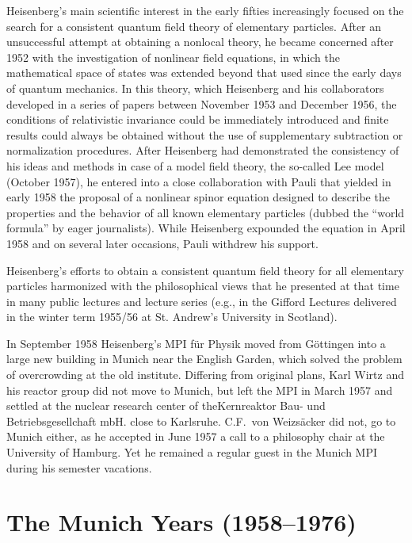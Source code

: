 \documentclass{article}
\begin{document}
Heisenberg's main scientific interest in the early fifties increasingly focused on the search for a consistent quantum field theory of elementary particles. After an unsuccessful attempt at obtaining a nonlocal theory, he became concerned after 1952 with the investigation of nonlinear field equations, in which the mathematical space of states was extended beyond that used since the early days of quantum mechanics. In this theory, which Heisenberg and his collaborators developed in a series of papers between November 1953 and December 1956, the conditions of relativistic invariance could be immediately introduced and finite results could always be obtained without the use of supplementary subtraction or normalization procedures. After Heisenberg had demonstrated the consistency of his ideas and methods in case of a model field theory, the so-called Lee model (October 1957), he entered into a close collaboration with Pauli that yielded in early 1958 the proposal of a nonlinear spinor equation designed to describe the properties and the behavior of all known elementary particles (dubbed the “world formula” by eager journalists). While Heisenberg expounded the equation in April 1958 and on several later occasions, Pauli withdrew his support.

Heisenberg's efforts to obtain a consistent quantum field theory for all elementary particles harmonized with the philosophical views that he presented at that time in many public lectures and lecture series (e.g., in the Gifford Lectures delivered in the winter term 1955/56 at St. Andrew's University in Scotland).

In September 1958 Heisenberg's MPI für Physik moved from Göttingen into a large new building in Munich near the English Garden, which solved the problem of overcrowding at the old institute. Differing from original plans, Karl Wirtz and his reactor group did not move to Munich, but left the MPI in March 1957 and settled at the nuclear research center of theKernreaktor Bau- und Betriebsgesellchaft mbH. close to Karlsruhe. C.F.~von Weizsäcker did not, go to Munich either, as he accepted in June 1957 a call to a philosophy chair at the University of Hamburg. Yet he remained a regular guest in the Munich MPI during his semester vacations.

\section{The Munich Years (1958--1976)}
\end{document}

